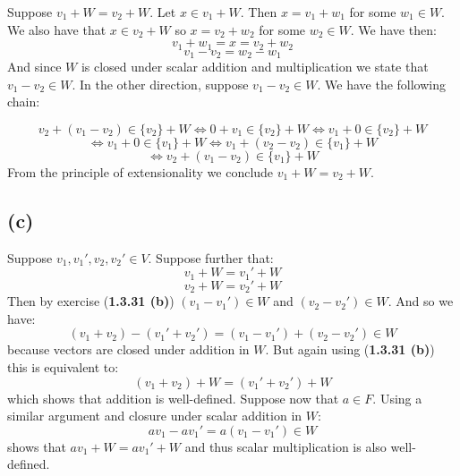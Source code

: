 \documentclass{article}
\begin{document}
Suppose \(v_{1} + W = v_{2} + W\). Let \(x \in v_{1} + W\). Then \(x = v_{1} + w_{1}\) for some \(w_{1} \in W\).
We also have that \(x \in v_{2} + W\) so \(x = v_{2} + w_{2}\) for some \(w_{2} \in W\). We have then:
\begin{equation*}
    v_{1} + w_{1} = x = v_{2} + w_{2}
\end{equation*}
\begin{equation*}
    v_{1} - v_{2} = w_{2} - w_{1}
\end{equation*}
And since \(W\) is closed under scalar addition and multiplication we state that \(v_{1} - v_{2} \in W\).
In the other direction, suppose \(v_{1} - v_{2} \in W\). We have the following chain:

\begin{equation*}
    v_{2} + (v_{1} - v_{2}) \in \{v_{2}\} + W \iff 0 + v_{1} \in \{v_{2}\} + W \iff v_{1} + 0 \in \{v_{2}\} + W
\end{equation*}
\begin{equation*}
    \iff v_{1} + 0 \in \{v_{1}\} + W \iff v_{1} + (v_{2} - v_{2}) \in \{v_{1}\} + W
\end{equation*}
\begin{equation*}
    \iff v_{2} + (v_{1} - v_{2}) \in \{v_{1}\} + W
\end{equation*}
From the principle of extensionality we conclude \(v_{1} + W = v_{2} + W\).

\subsection*{(c)}

Suppose \(v_{1}, v_{1}', v_{2}, v_{2}' \in V\). Suppose further that:
\begin{equation*}
    v_{1} + W = v_{1}' + W
\end{equation*}
\begin{equation*}
    v_{2} + W = v_{2}' + W
\end{equation*}
Then by exercise (\textbf{1.3.31 (b)}) \((v_{1} - v_{1}') \in W\) and \((v_{2} - v_{2}') \in W\).
And so we have:
\begin{equation*}
    (v_{1} + v_{2}) - (v_{1}' + v_{2}') = (v_{1} - v_{1}') + (v_{2} - v_{2}') \in W
\end{equation*}
because vectors are closed under addition in \(W\). But again using (\textbf{1.3.31 (b)}) this is equivalent to:
\begin{equation*}
    (v_{1} + v_{2}) + W = (v_{1}' + v_{2}') + W
\end{equation*}
which shows that addition is well-defined. Suppose now that \(a \in F\). Using a similar argument and 
closure under scalar addition in \(W\):
\begin{equation*}
    av_{1} - av_{1}' = a(v_{1} - v_{1}') \in W
\end{equation*}
shows that \(av_{1} + W = av_{1}' + W\) and thus scalar multiplication is also well-defined.
\end{document}

